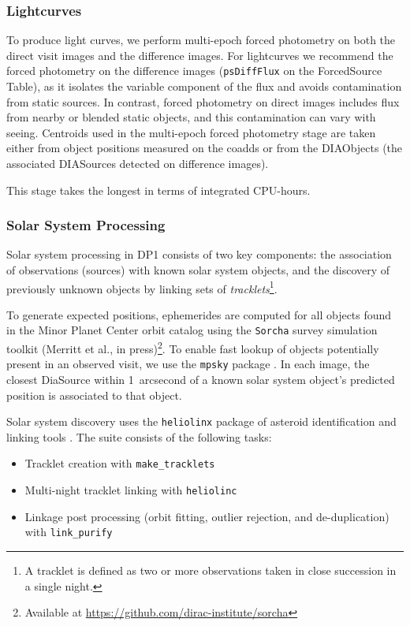 \subsubsection{Lightcurves}
\label{sssec:lightcurves}
To produce light curves, we perform multi-epoch \gls{forced photometry} on both the direct visit images and the difference images.
For lightcurves we recommend the \gls{forced photometry} on the difference images (\texttt{psDiffFlux} on the ForcedSource Table), as it isolates the variable component of the flux and avoids contamination from static sources.
In contrast, \gls{forced photometry} on direct images includes flux from nearby or blended static objects, and this contamination can vary with seeing.
Centroids used in the multi-epoch \gls{forced photometry} stage are taken either from object positions measured on the coadds or from the DIAObjects (the associated DIASources detected on difference images).

This stage takes the longest in terms of integrated \gls{CPU}-hours.


\subsubsection{Solar System Processing
\label{sec:drp:solsys}}

Solar system processing in \gls{DP1} consists of two key components: the association of observations (sources) with known solar system objects, and the discovery of previously unknown objects by linking sets of {\em tracklets}\footnote{A tracklet is defined as two or more observations taken in close succession in a single night.}.

To generate expected positions, ephemerides are computed for all objects found in the Minor Planet \gls{Center} orbit catalog using the \texttt{Sorcha} survey simulation toolkit (Merritt et al., in press)\footnote{Available at \url{https://github.com/dirac-institute/sorcha}}.
To enable fast lookup of objects potentially present in an observed visit, we use the {\tt mpsky} package \citep{mpsky}.
In each image, the closest DiaSource within 1~arcsecond of a known solar system object's predicted position is associated to that object.

Solar system discovery uses the {\tt heliolinx} package of asteroid identification and linking tools \citep{heliolinx}.
The suite consists of the following tasks:
\begin{itemize}
    \item Tracklet creation with {\tt make\_tracklets}
    \item Multi-night \gls{tracklet} linking with {\tt heliolinc}
    \item Linkage post processing (orbit fitting, outlier rejection, and de-duplication) with {\tt link\_purify}
\end{itemize}

